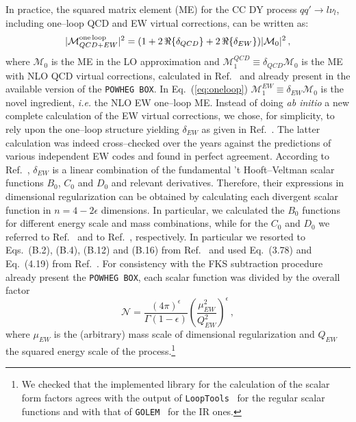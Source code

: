 \documentclass[11pt,a4paper]{article}
\newcommand\POWHEGBOX{\texttt{POWHEG BOX}}
\begin{document}
In practice, the squared matrix element (ME) for the CC DY process $q
q'\rightarrow l \nu_l$, including one--loop QCD and EW 
virtual corrections, can
be written as:
\begin{equation}
|\mathcal{M}_{QCD+EW}^{\rm one \, loop}|^2 = (1 + 2 \,
\Re\{\delta_{QCD}\} + 2 \, \Re\{\delta_{EW}\})|\mathcal{M}_0|^2 \, , %
\label{eq:oneloop}	
\end{equation}
where $\mathcal{M}_0$ is the ME in the LO approximation and
$\mathcal{M}^{QCD}_1 \equiv \delta_{QCD}\mathcal{M}_0$ is the ME with
NLO QCD virtual corrections, calculated in Ref.~\cite{Altarelli:1979ub} and
already present in the available version of the \POWHEGBOX{}. In Eq.~(\ref{eq:oneloop}) $\mathcal{M}^{EW}_1
\equiv \delta_{EW}\mathcal{M}_0$ is the novel ingredient, 
{\it i.e.} the NLO
EW one--loop ME. Instead of doing {\it ab initio} a new complete
calculation of the EW virtual corrections, we chose, for simplicity,
to rely upon the one--loop structure yielding $\delta_{EW}$ as given
in Ref.~\cite{Dittmaier:2001ay}.  The latter calculation was indeed
cross--checked over the years against the predictions of various
independent EW codes and found in perfect agreement.
According to Ref.~\cite{Dittmaier:2001ay}, $\delta_{EW}$ is a linear
combination of the fundamental 't Hooft--Veltman scalar functions
$B_0$, $C_0$ and $D_0$ \cite{'tHooft:1978xw} and relevant
derivatives. Therefore, their expressions in dimensional
regularization can be obtained by calculating each divergent scalar
function in $n = 4-2\epsilon$ dimensions.  In particular, we
calculated the $B_0$ functions for different energy scale and mass
combinations, while for the $C_0$ and $D_0$ we referred 
to Ref.~\cite{Dittmaier:2003bc} and to Ref.~\cite{Denner:2010tr}, 
respectively. In particular we resorted to Eqs.~(B.2), (B.4), (B.12) and (B.16) from 
Ref.~\cite{Dittmaier:2003bc} and used Eq.~(3.78) and Eq.~(4.19) from 
Ref.~\cite{Denner:2010tr}.  For consistency with the FKS \cite{Frixione:1995ms}
subtraction procedure already present the \POWHEGBOX{}, each scalar
function was divided by the overall factor \cite{Alioli:2010xd}
\begin{equation}
\mathcal{N}=\frac{(4\pi)^\epsilon}{\Gamma(1-\epsilon)}
\left(\frac{\mu_{EW}^2}{Q_{EW}^2}\right)^\epsilon \, ,
\end{equation}
where $\mu_{EW}$ is the (arbitrary) mass scale of dimensional
regularization and $Q_{EW}$ the squared energy scale of the process.\footnote{We checked 
that the implemented library for 
the calculation of the scalar form factors agrees with the output 
of {\tt LoopTools}~\cite{Hahn:2000jm} for the regular scalar functions and with that of 
{\tt GOLEM}~\cite{Cullen:2011kv,Binoth:2008uq} for the 
IR ones.}
\end{document}
